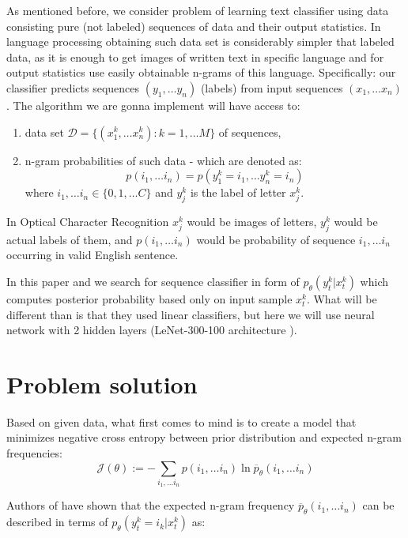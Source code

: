 \documentclass[shortabstract,lic,english]{iithesis}
\begin{document}
As mentioned before, we consider problem of learning text classifier using data
consisting pure (not labeled) sequences of data and their output statistics. In 
language processing obtaining such data set is considerably simpler that labeled data,
as it is enough to get images of written text in specific language and for output 
statistics use easily obtainable n-grams of this language. Specifically: our classifier
predicts sequences \( (y_1, \dots y_n) \) (labels) from input sequences \( (x_1, \dots x_n) \). The 
algorithm we are gonna implement will have access to:
\begin{enumerate}
    \item  data set \( \mathcal{D} = \lbrace (x_1^k, \dots x_n^k) : k = 1, \dots M \rbrace \) of
sequences,
    \item n-gram probabilities of such data - which are denoted as: 
\[ p(i_1, \dots i_n) = p(y_1^k = i_1, \dots y_n^k = i_n) \]
where \( i_1, \dots i_n \in \lbrace 0, 1, \dots C \rbrace \) and \( y_j^k \) is the label 
of letter \( x_j^k \).
\end{enumerate}

In Optical Character Recognition $x_j^k$ would be images of letters, $y_j^k$ would be actual labels of
them, and $p(i_1, \dots i_n)$ would be probability of sequence $i_1, \dots i_n$ occurring in valid
English sentence.

In this paper and \citep{liu2017unsupervised} we search for sequence classifier in form
of $p_\theta(y_t^k | x_t^k)$ which computes posterior probability based only on input sample $x_t^k$.
What will be different than \citep{liu2017unsupervised} is that they used linear classifiers, but here
we will use neural network with 2 hidden layers (\mbox{LeNet-300-100} architecture 
\citep{lecun1998gradient}).


\chapter{Problem solution}


Based on given data, what first comes to mind is to create a model that minimizes negative
cross entropy between prior distribution and expected n-gram frequencies:
\begin{equation} \label{cross-entropy}
    \mathcal{J}(\theta) := - \sum_{i_1, \dots i_n}p(i_1,\dots i_n) \ln \overline{p}_\theta(i_1, \dots i_n)
\end{equation}

Authors of \citep{liu2017unsupervised} have shown that the expected n-gram frequency $\overline{p}_\theta(i_1, \dots i_n)$
can be described in terms of $p_\theta(y_t^k = i_k | x_t^k)$ as:
\end{document}
